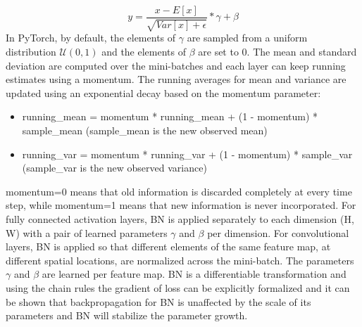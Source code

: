 \documentclass[11pt]{article}
\newcommand{\0}{\mat{0}}
\begin{document}
\begin{itemize}
    	\[
    		y =\frac{x-E[x]} {\sqrt{Var[x]+\epsilon}} * \gamma + \beta
    	\]
	In PyTorch,  by default, the elements of $\gamma$ are sampled from a uniform distribution $\mathcal{U}(0,1)$ and the elements of $\beta$ are set to 0. The mean and standard deviation are computed over the mini-batches and each layer can keep running estimates using a momentum. The running averages for mean and variance are updated using an exponential decay based on the momentum parameter:
	\begin{itemize}
    		\item running\_mean = momentum * running\_mean + (1 - momentum) * sample\_mean (sample\_mean is the new observed mean)
    		\item running\_var = momentum * running\_var + (1 - momentum) * sample\_var (sample\_var is the new observed variance)
    	\end{itemize}   
	momentum=0 means that old information is discarded completely at every time step, while momentum=1 means that new information is never incorporated. For fully connected activation layers, BN is applied separately to each dimension (H, W) with a pair of learned parameters $\gamma$ and $\beta$ per dimension. For convolutional layers, BN is applied so that different elements of the same feature map, at different spatial locations, are normalized across the mini-batch. The parameters $\gamma$ and $\beta$ are learned per feature map. BN is a differentiable transformation and using the chain rules the gradient of loss can be explicitly formalized and it can be shown that backpropagation for BN is unaffected by the scale of its parameters and BN will stabilize the parameter growth. 
 \end{itemize}   
\end{document}
